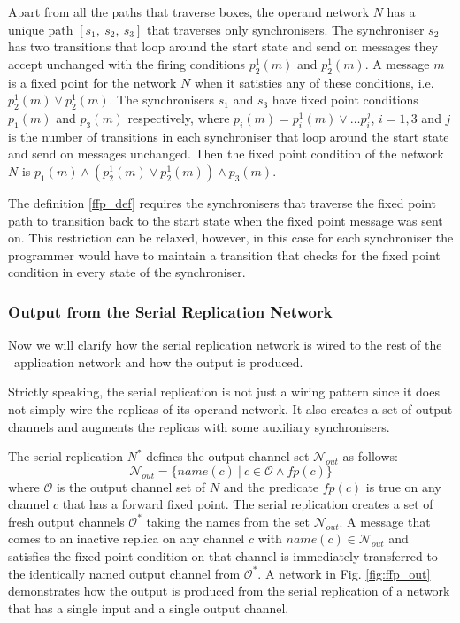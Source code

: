 Apart from all the paths that traverse boxes, the operand network $N$ has a unique path $[s_1, \: s_2, \: s_3]$ that traverses only synchronisers. The synchroniser $s_2$ has two transitions that loop around the start state and send on messages they accept unchanged with the firing conditions $p^{1}_2(m)$ and $p^{1}_2(m)$. A message $m$ is a fixed point for the network $N$ when it satisties any of these conditions, i.e. $p^{1}_2(m) \lor p^{1}_2(m)$. The synchronisers $s_1$ and $s_3$ have fixed point conditions $p_1(m)$ and $p_3(m)$ respectively, where $p_i(m) = p^{1}_i(m) \lor \dots p^{j}_i$, $i=1,3$ and $j$ is the number of transitions in each synchroniser that loop around the start state and send on messages unchanged. Then the fixed point condition of the network $N$ is $p_1(m) \land (p^{1}_2(m) \lor p^{1}_2(m)) \land p_3(m)$.

The definition \ref{ffp_def} requires the synchronisers that traverse the fixed point path to transition back to the start state when the fixed point message was sent on. This restriction can be relaxed, however, in this case for each synchroniser the programmer would have to maintain a transition that checks for the fixed point condition in every state of the synchroniser.


    \subsubsection{Output from the Serial Replication Network}
Now we will clarify how the serial replication network is wired to the rest of the \ak\ application network and how the output is produced.

Strictly speaking, the serial replication is not just a wiring pattern since it does not simply wire the replicas of its operand network. It also creates a set of output channels and augments the replicas with some auxiliary synchronisers.


The serial replication $N^{*}$ defines the output channel set $\mathcal{N}_{out}$ as follows:
\begin{equation}
\mathcal{N}_{out} = \{ name(c) \: | \: c \in \mathcal{O} \land fp(c) \}\nonumber
\end{equation}
where $\mathcal{O}$ is the output channel set of $N$ and the predicate $fp(c)$ is true on any channel $c$ that has a forward fixed point. The serial replication creates a set of fresh output channels $\mathcal{O}^{*}$ taking the names from the set $\mathcal{N}_{out}$. A message that comes to an inactive replica on any channel $c$ with $name(c) \in \mathcal{N}_{out}$ and satisfies the fixed point condition on that channel is immediately transferred to the identically named output channel from $\mathcal{O}^{*}$. A network in Fig. \ref{fig:ffp_out} demonstrates how the output is produced from the serial replication of a network that has a single input and a single output channel.

